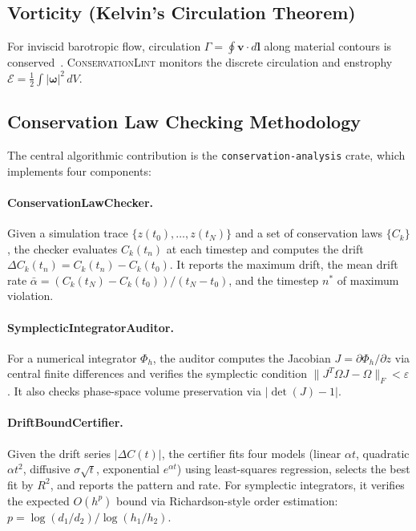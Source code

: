 \documentclass[11pt,a4paper]{article}
\begin{document}
\subsection{Vorticity (Kelvin's Circulation Theorem)}
For inviscid barotropic flow, circulation $\Gamma = \oint \mathbf{v} \cdot d\mathbf{l}$ along material contours is conserved~\citep{kelvin1869}. \textsc{ConservationLint} monitors the discrete circulation and enstrophy $\mathcal{E} = \frac{1}{2}\int |\boldsymbol{\omega}|^2\,dV$.

\subsection{Conservation Law Checking Methodology}
\label{sec:checking}

The central algorithmic contribution is the \texttt{conservation-analysis} crate, which implements four components:

\paragraph{ConservationLawChecker.} Given a simulation trace $\{z(t_0), \ldots, z(t_N)\}$ and a set of conservation laws $\{C_k\}$, the checker evaluates $C_k(t_n)$ at each timestep and computes the drift $\Delta C_k(t_n) = C_k(t_n) - C_k(t_0)$. It reports the maximum drift, the mean drift rate $\bar{\alpha} = (C_k(t_N) - C_k(t_0))/(t_N - t_0)$, and the timestep $n^*$ of maximum violation.

\paragraph{SymplecticIntegratorAuditor.} For a numerical integrator $\Phi_h$, the auditor computes the Jacobian $J = \partial \Phi_h / \partial z$ via central finite differences and verifies the symplectic condition $\|J^T \Omega J - \Omega\|_F < \varepsilon$. It also checks phase-space volume preservation via $|\det(J) - 1|$.

\paragraph{DriftBoundCertifier.} Given the drift series $|\Delta C(t)|$, the certifier fits four models (linear $\alpha t$, quadratic $\alpha t^2$, diffusive $\sigma\sqrt{t}$, exponential $e^{\alpha t}$) using least-squares regression, selects the best fit by $R^2$, and reports the pattern and rate. For symplectic integrators, it verifies the expected $O(h^p)$ bound via Richardson-style order estimation: $p = \log(d_1/d_2) / \log(h_1/h_2)$.
\end{document}
